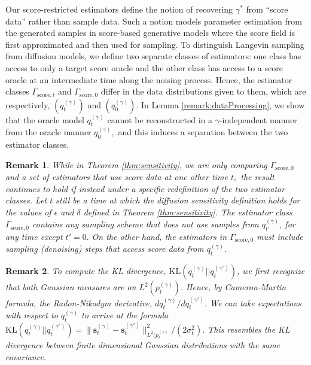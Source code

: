 \documentclass[11pt]{article}
\newcommand{\vect}[1]{\mathbf{#1}}
\theoremstyle{plain}
\newtheorem{remark}{Remark}
\newcommand{\1}{\mathbbm{1}}
\newcommand{\pdist}[2][]{p_{#1}^{(#2)}}
\newcommand{\qdist}[2][]{q_{#1}^{(#2)}}
\newcommand{\score}[2][]{\vect{s}_{#1}^{(#2)}}
\begin{document}
\begin{appendices}
Our score-restricted estimators define the notion of recovering $\gamma^*$ from ``score data'' rather than sample data. Such a notion models parameter estimation from the generated samples in score-based generative models where the score field is first approximated and then used for sampling. To distinguish Langevin sampling from diffusion models, we define two separate classes of estimators: one class has access to only a target score oracle and the other class has access to a score oracle at an intermediate time along the noising process. Hence, the estimator classes $\Gamma_{\mathrm{score},t}$ and $\Gamma_{\mathrm{score},0}$ differ in the data distributions given to them, which are respectively, $(\qdist[t]{\gamma})$ and $(\qdist[0]{\gamma}).$ In Lemma \ref{remark:dataProcessing}, we show that the oracle model $\qdist[t]{\gamma}$ cannot be reconstructed in a $\gamma$-independent manner from the oracle manner $\qdist[0]{\gamma},$ and this induces a separation between the two estimator classes.

\begin{remark}    \label{remark:score-restricted-estimators}
 While in Theorem \ref{thm:sensitivity}, we are only comparing $\Gamma_{\mathrm{score},0}$ and a set of estimators that use score data at one other time $t,$ the result continues to hold if instead under a specific redefinition of the two estimator classes. Let $t$ still be a time at which the diffusion sensitivity definition holds for the values of $\epsilon$ and $\delta$ defined in Theorem \ref{thm:sensitivity}. The estimator class $\Gamma_{\mathrm{score},0}$ contains any sampling scheme that does not use samples from $\qdist[t']{\gamma}$, for any time except $t' = 0.$ On the other hand, the estimators in $\Gamma_{\mathrm{score},0}$ must include sampling (denoising) steps that access score data from $\qdist[t]{\gamma}.$  


\end{remark}

\begin{remark}
    \label{remark:cameronMartin} To compute the KL divergence, $\mathrm{KL}(\qdist[t]{\gamma}||\qdist[t]{\gamma'})$, we first recognize that both Gaussian measures are on $L^2(\pdist[t]{\gamma}).$ Hence, by Cameron-Martin formula, the Radon-Nikodym derivative, $d\qdist[t]{\gamma}/d\qdist[t]{\gamma'}.$ We can take expectations with respect to $\qdist[t]{\gamma}$ to arrive at the formula $\mathrm{KL}(\qdist[t]{\gamma}||\qdist[t]{\gamma'}) = \|\score[t]{\gamma} - \score[t]{\gamma'}\|^2_{L^2(\pdist[t]{\gamma}}/(2\sigma_t^2).$ This resembles the KL divergence between finite dimensional Gaussian distributions with the same covariance. 
\end{remark}


\end{appendices}
\end{document}
